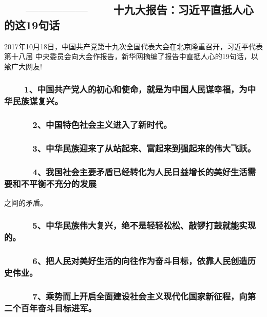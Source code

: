 \documentclass[11pt]{ctexart}
\begin{document}
{{{{\subsection{　　--------------- 　　十九大报告：习近平直抵人心的这19句话 　　}
\label{sec:orgc569934}
2017年10月18日，中国共产党第十九次全国代表大会在北京隆重召开，习近平代表第十八届
中央委员会向大会作报告，新华网摘编了报告中直抵人心的19句话，以飨广大网友!

\subsubsection{　   　1、中国共产党人的初心和使命，就是为中国人民谋幸福，为中华民族谋复兴。}
\label{sec:orgf643fc8}

\subsubsection{　 　　2、中国特色社会主义进入了新时代。}
\label{sec:orgda64bd6}

\subsubsection{　 　　3、中华民族迎来了从站起来、富起来到强起来的伟大飞跃。}
\label{sec:org090392e}

\subsubsection{　　 　4、我国社会主要矛盾已经转化为人民日益增长的美好生活需要和不平衡不充分的发展}
\label{sec:org6cd6864}
之间的矛盾。


\subsubsection{　 　　5、中华民族伟大复兴，绝不是轻轻松松、敲锣打鼓就能实现的。}
\label{sec:orged2c1ec}

\subsubsection{　 　　6、把人民对美好生活的向往作为奋斗目标，依靠人民创造历史伟业。}
\label{sec:org5722b46}

\subsubsection{　 　　7、乘势而上开启全面建设社会主义现代化国家新征程，向第二个百年奋斗目标进军。}
\label{sec:org326f0b5}

}}}}
\end{document}
